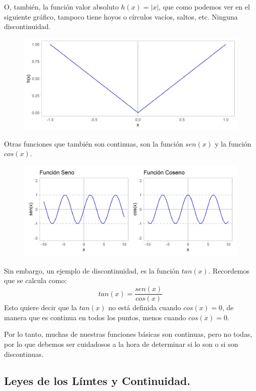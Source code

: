 \documentclass[12pt]{article}
\begin{document}
\newpage

O, también, la función valor absoluto $h(x) = |x|$, que como podemos ver en el siguiente gráfico, tampoco tiene hoyos o círculos vacíos, saltos, etc. Ninguna discontinuidad.

\begin{figure}[hbt!]
\centering
\includegraphics[scale=0.7]{img/continuity_h.jpg}
\end{figure}

Otras funciones que también son continuas, son la función $sen(x)$ y la función $cos(x)$.

\begin{figure}[hbt!]
\centering
\includegraphics[scale=0.7]{img/sen_cos_continuity.jpg}
\end{figure}

Sin embargo, un ejemplo de discontinuidad, es la función $tan(x)$. Recordemos que se calcula como:
\[tan(x) = \frac{sen(x)}{cos(x)}\]
Esto quiere decir que la $tan(x)$ no está definida cuando $cos(x) = 0$, de manera que es continua en todos los puntos, menos cuando $cos(x) = 0$.

Por lo tanto, muchas de nuestras funciones básicas son continuas, pero no todas, por lo que debemos ser cuidadosos a la hora de determinar si lo son o si son discontinuas.


\subsection{Leyes de los Límtes y Continuidad.}
\end{document}
